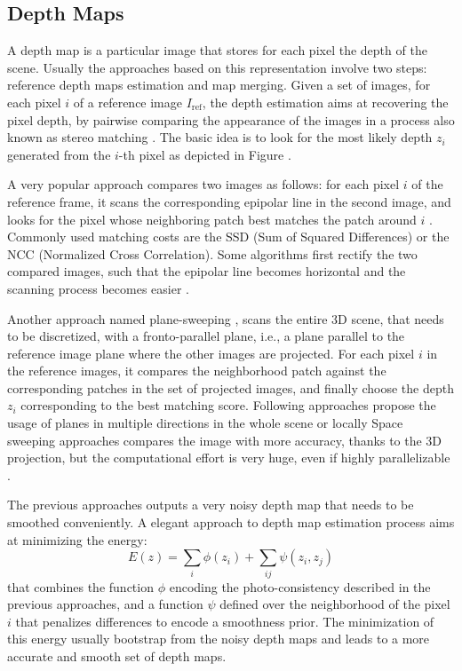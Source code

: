 \subsection{Depth Maps}
A depth map is a particular image that stores for each pixel the depth of the scene.
Usually the approaches based on this representation involve two steps: reference depth maps estimation and map merging.
Given a set of images, for each pixel $i$ of a reference image $I_{\text{ref}}$, the depth estimation aims at recovering the pixel depth, by pairwise comparing the appearance of the images in a process also known as stereo matching \cite{scharstein2002taxonomy}. 
The basic idea is to look for the most likely depth $z_i$ generated from the $i$-th pixel as depicted in Figure .

A very popular approach compares two images as follows: for each pixel $i$ of the reference frame, it scans the corresponding epipolar line in the second image, and looks for the pixel whose neighboring patch best matches the patch around $i$  \cite{lhuillier2002match}. 
Commonly used matching costs are the SSD (Sum of Squared Differences) or the NCC (Normalized Cross Correlation).
Some algorithms first rectify the two compared images, such that the epipolar line becomes horizontal and the scanning process becomes easier 
\cite{kang2001handling,bradley2008accurate,moons20093d}. 

Another approach named plane-sweeping \cite{collins1996space}, scans the entire 3D scene, that needs to be discretized, with a fronto-parallel plane, i.e., a plane parallel to the reference image plane where the other images are projected. For each pixel $i$ in the reference images, it compares the neighborhood patch against the corresponding patches in the set of projected images, and finally choose the depth $z_i$ corresponding to the best matching score. 
Following approaches propose the usage of planes in multiple directions in the whole scene \cite{gallup2007real} or locally \cite{sinha2014efficient}
Space sweeping approaches compares the image with more accuracy, thanks to the 3D projection, but the computational effort is very huge, even if highly parallelizable \cite{yang2003multi}.

The previous approaches outputs a very noisy depth map that needs to be smoothed conveniently. 
A elegant approach to depth map estimation process aims at minimizing the energy:
\begin{equation}
 \label{eq:depthenergy} 
 E(z) = \sum_i \phi(z_i)  + \sum_{ij} \psi(z_i,z_j)
\end{equation}
that combines the function $\phi$ encoding the photo-consistency described in the previous approaches, and a function $\psi$ defined over the neighborhood of the pixel $i$ that penalizes differences to encode a smoothness prior. The minimization of this energy usually bootstrap from the noisy depth maps and leads to a more accurate and smooth set of depth maps.

